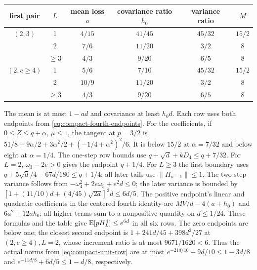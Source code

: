 \begin{center}\small
\begin{tabular}{@{}cccccc@{}}
\toprule
first pair & $L$ & mean loss $a$ & covariance ratio $h_0$ & variance ratio & $M$\\\midrule
$(2,3)$&1&$4/15$&$41/45$&$45/32$&$15/2$\\
 &2&$7/6$&$11/20$&$3/2$&8\\
 &$\ge3$&$4/3$&$9/20$&$6/5$&8\\
$(2,c\ge4)$&1&$5/6$&$7/10$&$45/32$&$15/2$\\
 &2&$10/9$&$11/20$&$3/2$&8\\
 &$\ge3$&$4/3$&$9/20$&$6/5$&8\\\bottomrule
\end{tabular}
\end{center}
The mean is at most $1-ad$ and covariance at least $h_0d$.
Each row uses both endpoints from \eqref{eq:compact-fourth-endpoints}.
For the coefficients, if $0\le Z\le q+\alpha$, $\mu\le1$,
the tangent at $p=3/2$ is
$51/8+9\alpha/2+3\alpha^2/2+(-1/4+\alpha^2)^2/6$.
It is below $15/2$ at $\alpha=7/32$ and below eight at $\alpha=1/4$.
The one-step row bounds use $q+\sqrt d+kD_4\le q+7/32$.
For $L=2$, $\omega_3-2e>0$ gives the endpoint $q+1/4$.
For $L\ge3$ the first boundary uses
$q+5\sqrt d/4-67d/180\le q+1/4$; all later tails use $\|\Pi_{n-1}\|\le1$.
The two-step variance follows from
$-\omega_4^2+2e\omega_5+e^2d\le0$;
the later variance is bounded by
$[1+(11/10)d+(4/45)\sqrt{2d}]^2d\le6d/5$.
The positive endpoint's linear and quadratic coefficients in the
centered fourth identity are $MV/d-4(a+h_0)$ and $6a^2+12ah_0$;
all higher terms sum to a nonpositive quantity on $d\le1/24$.
These formulas and the table give $\mathbb E[pH_L^4]\le e^{6d}$ in all six rows.
The zero endpoints are below one; the closest second endpoint is
$1+241d/45+398d^2/27$ at $(2,c\ge4),L=2$,
whose increment ratio is at most $9671/1620<6$.
Thus the actual norms from \eqref{eq:compact-unit-row} are at most
$e^{-21d/16}+9d/10\le1-3d/8$ and
$e^{-11d/8}+6d/5\le1-d/8$, respectively.

